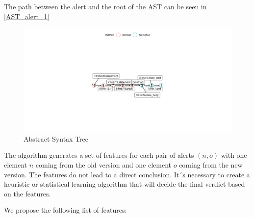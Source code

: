 \documentclass[
]{article}
\begin{document}
\normalsize

The path between the alert and the root of the AST can be seen in
\ref{AST_alert_1}

\small

\begin{figure}[H]
\includegraphics[width=1\linewidth]{report_files/figure-latex/unnamed-chunk-5-1} \caption{Abstract Syntax Tree \label{AST_alert_1}}\label{fig:unnamed-chunk-5}
\end{figure}

\normalsize

The algorithm generates a set of features for each pair of alerts
\((n,o)\) with one element \(n\) coming from the old version and one
element \(o\) coming from the new version. The features do not lead to a
direct conclusion. It´s necessary to create a heuristic or statistical
learning algorithm that will decide the final verdict based on the
features.

We propose the following list of features:
\end{document}

